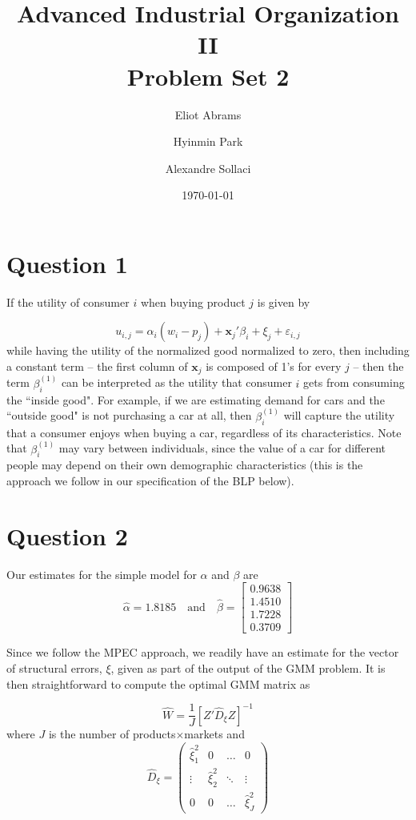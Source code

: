 \documentclass[a4paper,11pt]{article}
\begin{document}
\title{Advanced Industrial Organization II \\ Problem Set 2}
\author{Eliot Abrams \and Hyinmin Park \and Alexandre Sollaci}
\date{\today}
\maketitle

\section*{Question 1}

If the utility of consumer $i$ when buying product $j$ is given by

\[ u_{i,j} = \alpha_i(w_i - p_j) + \mathbf{x}_j'\beta_i + \xi_j + \varepsilon_{i,j} \]
while having the utility of the normalized good normalized to zero, then including a constant term -- the first column of $\mathbf{x}_j$ is composed of 1's for every $j$ -- then the term $\beta_i^{(1)}$ can be interpreted as the utility that consumer $i$ gets from consuming the ``inside good". For example, if we are estimating demand for cars and the ``outside good" is not purchasing a car at all, then $\beta_i^{(1)}$ will capture the utility that a consumer enjoys when buying a car, regardless of its characteristics. Note that $\beta_i^{(1)}$ may vary between individuals, since the value of a car for different people may depend on their own demographic characteristics (this is the approach we follow in our specification of the BLP below). 

\section*{Question 2}

Our estimates for the simple model for $\alpha$ and $\beta$ are
\[
\hat\alpha = 1.8185 \quad \mbox{and}  \quad
\hat\beta = \left[\begin{array}{l} 0.9638 \\ 1.4510 \\ 1.7228 \\ 0.3709 \end{array}\right] \]

Since we follow the MPEC approach, we readily have an estimate for the vector of structural errors, $\xi$, given as part of the output of the GMM problem. It is then straightforward to compute the optimal GMM matrix as

\[\hat W = \frac{1}{J}\left[Z'\hat{D}_{\xi}Z\right]^{-1} \]where $J$ is the number of products$\times$markets and 
\[ \hat{D}_{\xi} = \left(\begin{array}{cccc}
\hat\xi_1^2 & 0 & \ldots & 0 \\
\vdots & \hat\xi_2^2 & \ddots & \vdots \\
0 & 0 & \ldots & \hat\xi_J^2
\end{array} \right) \]
\end{document}
